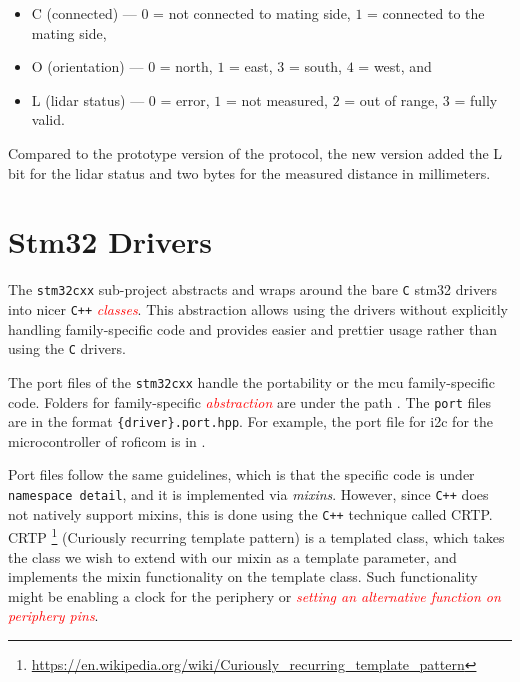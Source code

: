 \documentclass[
  digital,     %
  oneside,     %
  nosansbold,  %
  nocolorbold, %
  nolof,         %
  nolot,         %
]{fithesis4}
\newcommand{\TODO}[1]{\textcolor{red}{\textit{#1}}}
\newcommand{\TODOLIST}[1]{}
\begin{document}
{{{\begin{itemize}
    \item C (connected) --- $0$ = not connected to mating side, $1$ = connected to the mating side,
    \item O (orientation) --- $0$ = north, $1$ = east, $3$ = south, $4$ = west, and
    \item L (\acrshort{lidar} status) --- $0$ = error, $1$ = not measured, $2$ = out of range, $3$ = fully valid.
\end{itemize}

Compared to the prototype version of the protocol, the new version added the L bit for the \acrshort{lidar} status and two bytes for the measured distance in millimeters.

\section{ Stm32 Drivers }
\TODOLIST{
\begin{itemize}
    \item already implemented
    \item port files --- portability
    \item to implement --- \acrshort{i2c}
\end{itemize}
}

The \lstinline|stm32cxx| sub-project abstracts and wraps around the bare 
\verb|C| stm32 drivers into nicer \verb|C++| \TODO{classes}. This abstraction allows using the drivers without explicitly handling family-specific code and provides easier and prettier usage rather than using the \verb|C| drivers.

The port files of the \lstinline|stm32cxx| handle the portability or the \acrshort{mcu} family-specific code. Folders for family-specific \TODO{abstraction} are under the path . The \verb|port| files are in the format \verb|{driver}.port.hpp|. For example, the port file for \acrshort{i2c} for the microcontroller of \acrshort{roficom} is in .

Port files follow the same guidelines, which is that the specific code is under \lstinline|namespace detail|, and it is implemented via \emph{mixins}. However, since \verb|C++| does not natively support mixins, this is done using the \verb|C++| technique called CRTP. CRTP \footnote{\url{https://en.wikipedia.org/wiki/Curiously_recurring_template_pattern}} (Curiously recurring template pattern) is a templated class, which takes the class we wish to extend with our mixin as a template parameter, and implements the mixin functionality on the template class. Such functionality might be enabling a clock for the periphery or \TODO{setting an alternative function on periphery pins}.

}}}
\end{document}
